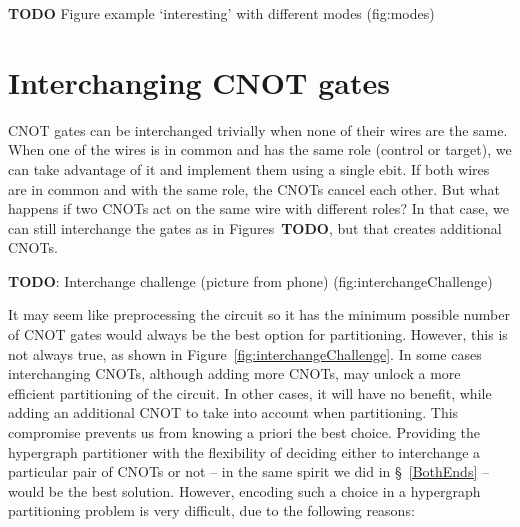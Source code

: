 \textbf{TODO} Figure example `interesting' with different modes (fig:modes)

\section{Interchanging CNOT gates}

CNOT gates can be interchanged trivially when none of their wires are the same. When one of the wires is in common and has the same role (control or target), we can take advantage of it and implement them using a single ebit. If both wires are in common and with the same role, the CNOTs cancel each other. But what happens if two CNOTs act on the same wire with different roles? In that case, we can still interchange the gates as in Figures~\textbf{TODO}, but that creates additional CNOTs.

\textbf{TODO}: Interchange challenge (picture from phone) (fig:interchangeChallenge)

It may seem like preprocessing the circuit so it has the minimum possible number of CNOT gates would always be the best option for partitioning. However, this is not always true, as shown in Figure~\ref{fig:interchangeChallenge}. In some cases interchanging CNOTs, although adding more CNOTs, may unlock a more efficient partitioning of the circuit. In other cases, it will have no benefit, while adding an additional CNOT to take into account when partitioning. This compromise prevents us from knowing a priori the best choice. Providing the hypergraph partitioner with the flexibility of deciding either to interchange a particular pair of CNOTs or not -- in the same spirit we did in \S~\ref{BothEnds} -- would be the best solution. However, encoding such a choice in a hypergraph partitioning problem is very difficult, due to the following reasons:

